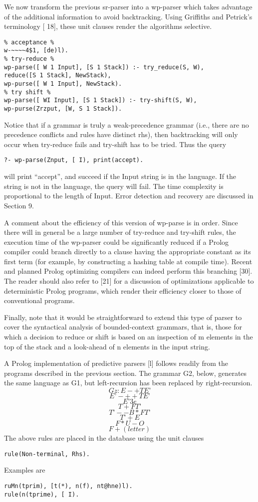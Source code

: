 We now transform the previous sr-parser into a wp-parser which takes
advantage of the additional information to avoid backtracking. Using 
Griffiths and Petrick’s terminology [ 18], these unit clauses render the
algorithms selective. 
\begin{verbatim}
% acceptance %
w-~~~~4$1, [de)l).
% try-reduce %
wp-parse([ W 1 Input], [S 1 Stack]) :- try_reduce(S, W),
reduce([S 1 Stack], NewStack),
wp-purse([ W 1 Input], NewStack).
% try shift %
wp-parse([ WI Input], [S 1 Stack]) :- try-shift(S, W),
wp-purse(Zrzput, [W, S 1 Stack]). 
\end{verbatim}
Notice that if a grammar is truly a weak-precedence grammar (i.e., there are no
precedence conflicts and rules have distinct rhs), then backtracking will only
occur when try-reduce fails and try-shift has to be tried. Thus the query
\begin{verbatim}
?- wp-parse(Znput, [ I), print(accept).
\end{verbatim}
will print “accept”, and succeed if the Input string is in the language. If the string
is not in the language, the query will fail. The time complexity is proportional to
the length of Input. Error detection and recovery are discussed in Section 9.

A comment about the efficiency of this version of wp-parse is in order. Since
there will in general be a large number of try-reduce and try-shift rules, the
execution time of the wp-parser could be significantly reduced if a Prolog compiler
could branch directly to a clause having the appropriate constant as its first term
(for example, by constructing a hashing table at compile time). Recent and
planned Prolog optimizing compilers can indeed perform this branching [30].
The reader should also refer to [21] for a discussion of optimizations applicable
to deterministic Prolog programs, which render their efficiency closer to those of
conventional programs. 

Finally, note that it would be straightforward to extend this type of parser to
cover the syntactical analysis of bounded-context grammars, that is, those for
which a decision to reduce or shift is based on an inspection of m elements in
the top of the stack and a look-ahead of n elements in the input string. 


A Prolog implementation of predictive parsers [l] follows readily from the
programs described in the previous section. The grammar G2, below, generates
the same language as G1, but left-recursion has been replaced by right-recursion. 
\[Gz: E -+ TE’\]
\[E’ -+ + TE’\]
\[E’ 3 e\]
\[T +FT’\]
\[T’ --B * FT’\]
\[T’ + E\]
\[F *U-O\]
\[F + (letter)\]
The above rules are placed in the database using the unit clauses
\begin{verbatim}
rule(Non-terminal, Rhs).
\end{verbatim}
Examples are
\begin{verbatim}
ruMn(tprim), [t(*), n(f), nt@hne)l).
rule(n(tprime), [ I). 
\end{verbatim}

